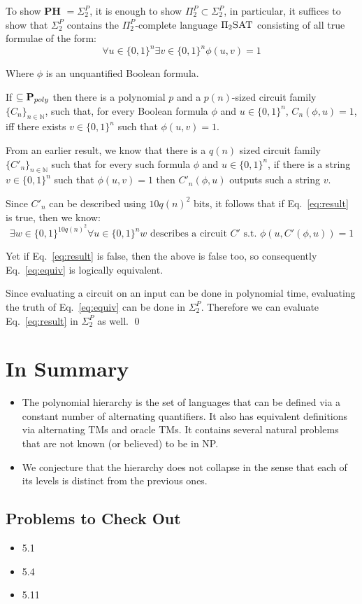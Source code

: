 \documentclass[11pt]{article} %
\begin{document}

 To show {\bf PH} $= \Sigma_2^P$, it is enough to show $\Pi_2^P \subset \Sigma_2^P$, in particular, it suffices to show that $\Sigma_2^P$ contains the $\Pi_2^P$-complete language $\Pi_2\textsc{SAT}$ consisting of all true formulae of the form:
\begin{equation}
\forall u \in \{0,1\}^n \exists v \in \{0,1\}^n \phi(u,v) = 1
\label{eq:result}
\end{equation}

Where $\phi$ is an unquantified Boolean formula.

If  $\subseteq \text{{\bf P}}_{poly}$ then there is a polynomial $p$ and a $p(n)$-sized circuit family $\{C_n\}_{n \in \mathbb{N}}$, such that, for every Boolean formula $\phi$ and $u \in \{0,1\}^n$, $C_n(\phi, u) = 1$, iff there exists $v \in \{0,1\}^n$ such that $\phi(u,v) = 1$.

From an earlier result, we know that there is a $q(n)$ sized circuit family $\{C'_n\}_{n \in \mathbb{N}}$ such that for every such formula $\phi$ and $u \in \{0,1\}^n$, if there is a string $v \in \{0,1\}^n$ such that $\phi(u,v) = 1$ then $C'_n(\phi,u)$ outputs such a string $v$.

Since $C'_n$ can be described using $10q(n)^2$ bits, it follows that if Eq.~\ref{eq:result} is true, then we know:
\begin{equation}
\exists w \in \{0,1\}^{10q(n)^2} \forall u \in \{0,1\}^n w \text{ describes a circuit } C' \text{ s.t. } \phi(u,C'(\phi,u)) = 1
\label{eq:equiv}
\end{equation}

Yet if Eq.~\ref{eq:result} is false, then the above is false too, so consequently Eq.~\ref{eq:equiv} is logically equivalent.

Since evaluating a circuit on an input can be done in polynomial time, evaluating the truth of Eq.~\ref{eq:equiv} can be done in $\Sigma_2^P$. Therefore we can evaluate Eq.~\ref{eq:result} in $\Sigma_2^P$ as well. \qed



\section{In Summary}

\begin{itemize}
\item The polynomial hierarchy is the set of languages that can be defined via a
constant number of alternating quantifiers. It also has equivalent definitions
via alternating TMs and oracle TMs. It contains several natural problems
that are not known (or believed) to be in NP.
\item We conjecture that the hierarchy does not collapse in the sense that each of
its levels is distinct from the previous ones.
\end{itemize}

\subsection{Problems to Check Out}
\begin{itemize}
\item 5.1
\item 5.4
\item 5.11
\end{itemize}
\end{document}
